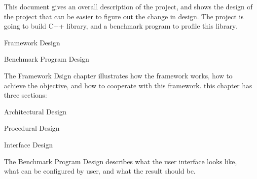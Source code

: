 This document gives an overall description of the project, and shows the design of the project that can be easier to figure out the change in design. The project is going to build C++ library, and a benchmark program to profile this library.
\begin{DoxyItemize}
\item Framework Design
\item Benchmark Program Design
\end{DoxyItemize}

The Framework Dsign chapter illustrates how the framework works, how to achieve the objective, and how to cooperate with this framework. this chapter has three sections\+:
\begin{DoxyItemize}
\item Architectural Design
\item Procedural Design
\item Interface Design
\end{DoxyItemize}

The Benchmark Program Design describes what the user interface looks like, what can be configured by user, and what the result should be. 